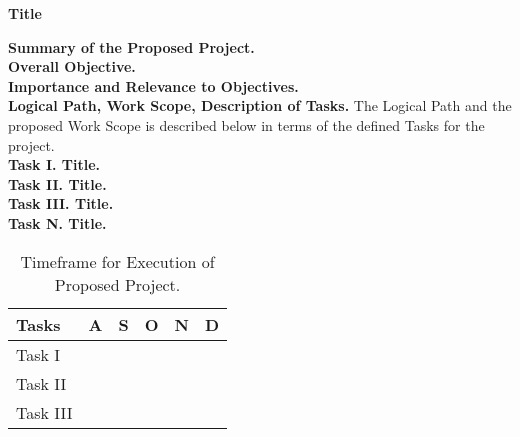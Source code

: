 \documentclass[11pt,a4paper]{article}
\begin{document}
\begin{center}\textbf{Title}\end{center}

\noindent\textbf{Summary of the Proposed Project.} 
\\

\noindent\textbf{Overall Objective.}
\\

\noindent\textbf{Importance and Relevance to Objectives.}
\\

\noindent\textbf{Logical Path, Work Scope, Description of Tasks.} The Logical Path and the proposed Work Scope is described below in terms of the defined Tasks for the project.
\\

\noindent\textbf{Task I. Title.}
\\

\noindent\textbf{Task II. Title.}
\\

\noindent\textbf{Task III. Title.}
\\

\noindent\textbf{Task N. Title.}

\begin{table}[h!]
    \centering
    \caption{Timeframe for Execution of Proposed Project.}
    \begin{tabular}{|l|l|l|l|l|l|}
        \hline
        \textbf{Tasks} & \textbf{A} & \textbf{S} & \textbf{O} & \textbf{N} & \textbf{D} \\
        \hline
        Task I & & & & & \\
        \hline
        Task II & & & & & \\
        \hline
        Task III & & & & & \\
        \hline
    \end{tabular}
    \label{tab-timeframe}
\end{table}

%
%
\end{document}
